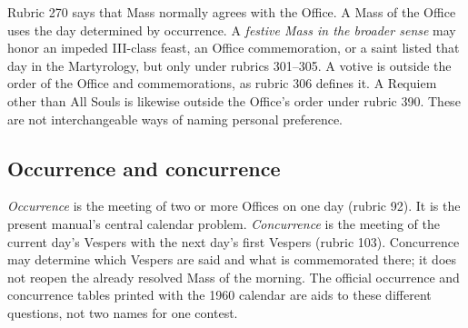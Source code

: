 Rubric 270 says that Mass normally agrees with the Office. A Mass of the Office uses the day determined by occurrence. A \emph{festive Mass in the broader sense} may honor an impeded III-class feast, an Office commemoration, or a saint listed that day in the Martyrology, but only under rubrics 301--305. A votive is outside the order of the Office and commemorations, as rubric 306 defines it. A Requiem other than All Souls is likewise outside the Office's order under rubric 390. These are not interchangeable ways of naming personal preference.

\subsection{Occurrence and concurrence}

\emph{Occurrence} is the meeting of two or more Offices on one day (rubric 92). It is the present manual's central calendar problem. \emph{Concurrence} is the meeting of the current day's Vespers with the next day's first Vespers (rubric 103). Concurrence may determine which Vespers are said and what is commemorated there; it does not reopen the already resolved Mass of the morning. The official occurrence and concurrence tables printed with the 1960 calendar are aids to these different questions, not two names for one contest.
